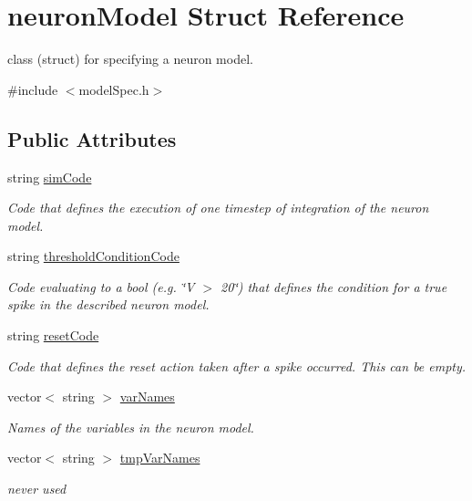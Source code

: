 \hypertarget{structneuronModel}{\section{neuron\+Model Struct Reference}
\label{structneuronModel}
}


class (struct) for specifying a neuron model.  




{\ttfamily \#include $<$model\+Spec.\+h$>$}

\subsection*{Public Attributes}
\begin{DoxyCompactItemize}
\item 
string \hyperlink{structneuronModel_a9e6536fd15b69fa24b708e41f97df899}{sim\+Code}
\begin{DoxyCompactList}\small\item\em Code that defines the execution of one timestep of integration of the neuron model. \end{DoxyCompactList}\item 
string \hyperlink{structneuronModel_a9b0fae36963fb760040c3b1d22bee25c}{threshold\+Condition\+Code}
\begin{DoxyCompactList}\small\item\em Code evaluating to a bool (e.\+g. \char`\"{}\+V $>$ 20\char`\"{}) that defines the condition for a true spike in the described neuron model. \end{DoxyCompactList}\item 
string \hyperlink{structneuronModel_ad97df9af00fba946865debf6cd539217}{reset\+Code}
\begin{DoxyCompactList}\small\item\em Code that defines the reset action taken after a spike occurred. This can be empty. \end{DoxyCompactList}\item 
vector$<$ string $>$ \hyperlink{structneuronModel_a9a9156ffb643572fd67f6e585ef79ad0}{var\+Names}
\begin{DoxyCompactList}\small\item\em Names of the variables in the neuron model. \end{DoxyCompactList}\item 
vector$<$ string $>$ \hyperlink{structneuronModel_ab193cb434db2df5f1fa9a79fba30af83}{tmp\+Var\+Names}
\begin{DoxyCompactList}\small\item\em never used \end{DoxyCompactList}\item 

\end{DoxyCompactItemize}
